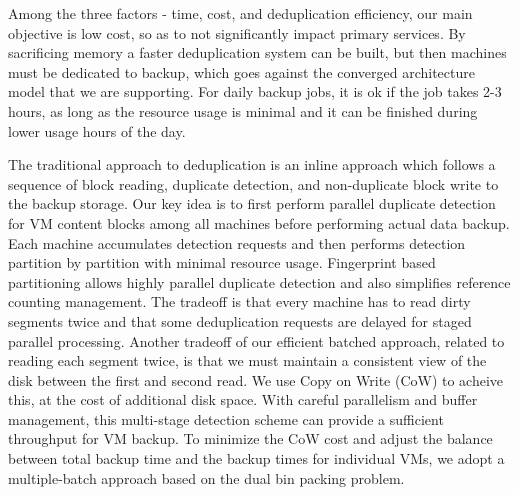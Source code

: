 
Among the three factors - time, cost, and deduplication efficiency, our main
objective is low cost, so as to not significantly impact primary services. By
sacrificing memory a faster deduplication system
can be built, but then machines must be dedicated to backup, which goes
against the converged architecture model that we are supporting. For daily
backup jobs, it is ok if the job takes 2-3 hours, as long as the resource
usage is minimal and it can be finished during lower usage hours of the day.

The traditional approach to  deduplication is an inline approach which follows
a sequence of block reading, duplicate detection,  and non-duplicate  block write to the 
backup storage.  
Our key idea  is to  first perform parallel duplicate detection for VM content blocks 
among all machines before performing actual data backup. Each machine
accumulates detection requests and  then performs detection   partition by partition 
with minimal resource usage.
Fingerprint based partitioning allows highly parallel duplicate detection  and also simplifies 
reference counting management.  
The tradeoff is that every machine has to read dirty segments twice
and that some deduplication requests are delayed for staged parallel processing.
Another tradeoff of our efficient batched approach, related to reading each
segment twice, is that we must maintain a consistent view of the disk between
the first and second read. We use Copy on Write (CoW) to acheive this, at the
cost of additional disk space.
With careful parallelism and buffer  management,
this multi-stage detection scheme can provide  a sufficient throughput for VM
backup. To minimize the CoW cost and adjust the balance between total backup
time and the backup times for individual VMs, we adopt a multiple-batch
approach based on the dual bin packing problem.


